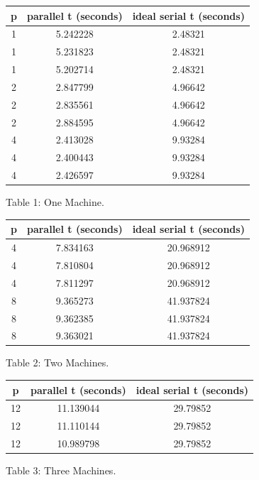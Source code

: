\documentclass[11pt, a4paper, parskip=full]{article}
\begin{document}
	\vspace{20pt}
	\begin{center}
		\begin{tabular}{ c | c | c}

			p & parallel t (seconds) & ideal serial t (seconds) \\
			\hline
			1 & 5.242228 & 2.48321 \\
			1 & 5.231823 & 2.48321 \\
			1 & 5.202714 & 2.48321 \\
			2 & 2.847799 & 4.96642 \\
			2 & 2.835561 & 4.96642 \\
			2 & 2.884595 & 4.96642 \\
			4 & 2.413028 & 9.93284 \\
			4 & 2.400443 & 9.93284 \\
			4 & 2.426597 & 9.93284 
			
		\end{tabular}
	
		Table 1: One Machine.
	\end{center}

	\vspace{20pt}
	\begin{center}
		\begin{tabular}{ c | c | c}

			p & parallel t (seconds) & ideal serial t (seconds) \\
			\hline
			4 & 7.834163 & 20.968912 \\
			4 & 7.810804 & 20.968912 \\
			4 & 7.811297 & 20.968912 \\
			8 & 9.365273 & 41.937824 \\
			8 & 9.362385 & 41.937824 \\
			8 & 9.363021 & 41.937824
			
		\end{tabular}
		
		Table 2: Two Machines.
	\end{center}

	\vspace{20pt}
	\begin{center}
		\begin{tabular}{ c | c | c}

			p & parallel t (seconds) & ideal serial t (seconds) \\
			\hline
			12 & 11.139044 & 29.79852 \\
			12 & 11.110144 & 29.79852 \\
			12 & 10.989798 & 29.79852
			
		\end{tabular}
		
		Table 3: Three Machines.
	\end{center}
	\vspace{20pt}
	
\end{document}
